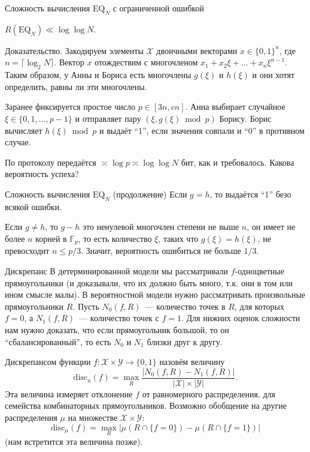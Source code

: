 \documentclass[handout]{beamer}
\renewcommand\le{\leqslant}
\begin{document}
\begin{frame}{Сложность вычисления $\mathrm{EQ}_N$ с ограниченной ошибкой}
    \begin{theorem}
        $R(\mathrm{EQ}_N)\ll \log\log N$.
    \end{theorem}

    Доказательство.
        Закодируем элементы $\mathcal X$ двоичными векторами $x\in\{0,1\}^n$,
        где $n=\lceil\log_2N\rceil$. Вектор $x$ отождествим с многочленом
        $x_1+x_2\xi+\ldots+x_n\xi^{n-1}$. Таким образом, у Анны и Бориса есть
        многочлены $g(\xi)$ и $h(\xi)$ и они хотят определить, равны ли эти
        многочлены.
        \pause\vspace{5pt}

        Заранее фиксируется простое число $p\in[3n,cn]$. Анна выбирает случайное
        $\xi\in\{0,1,\ldots,p-1\}$ и отправляет пару $(\xi,g(\xi)\bmod p)$ Борису.
        Борис вычисляет $h(\xi)\bmod p$ и выдаёт ``1'', если значения совпали и
        ``0'' в противном случае.

        По протоколу передаётся $\asymp\log p\asymp\log\log N$ бит, как и
        требовалось. Какова вероятность успеха?
\end{frame}


\begin{frame}{Сложность вычисления $\mathrm{EQ}_N$ (продолжение)}
    Если $g=h$, то выдаётся ``1'' безо всякой ошибки.

    Если $g\ne h$, то $g-h$ это ненулевой многочлен степени не выше $n$, он
    имеет не более $n$ корней в $\mathbb{F}_p$, то есть количество $\xi$, таких
    что $g(\xi)=h(\xi)$, не превосходит $n\le p/3$. Значит, вероятность
    ошибиться не больше $1/3$.

\end{frame}


\begin{frame}{Дискрепанс}
    В детерминированной модели мы рассматривали $f$-одноцветные прямоугольники
    (и доказывали, что их должно быть много, т.к. они в том или ином смысле малы). В вероятностной модели нужно
    рассматривать произвольные прямоугольники $R$. Пусть $N_0(f,R)$~---
    количество точек в $R$, для которых $f=0$, а $N_1(f,R)$~--- количество точек
    с $f=1$. Для нижних оценок сложности нам нужно доказать, что если
    прямоугольник большой, то он ``сбалансированный'', то есть $N_0$ и $N_1$
    близки друг к другу.
    \pause

    Дискрепансом функции $f\colon\mathcal X\times\mathcal Y\to\{0,1\}$ назовём
    величину
    $$
    \mathrm{disc}_u(f)=\max_R\frac{|N_0(f,R)-N_1(f,R)|}{|\mathcal
    X|\times|\mathcal Y|}.
    $$
    Эта величина измеряет отклонение $f$ от равномерного
    распределения, для семейства комбинаторных прямоугольников.
    \pause
    Возможно обобщение на другие распределения $\mu$ на множестве $\mathcal
    X\times\mathcal Y$:
    $$
    \mathrm{disc}_\mu(f)=\max_R|\mu(R\cap\{f=0\})-\mu(R\cap\{f=1\})|
    $$
    (нам встретится эта величина позже).
\end{frame}
\end{document}
